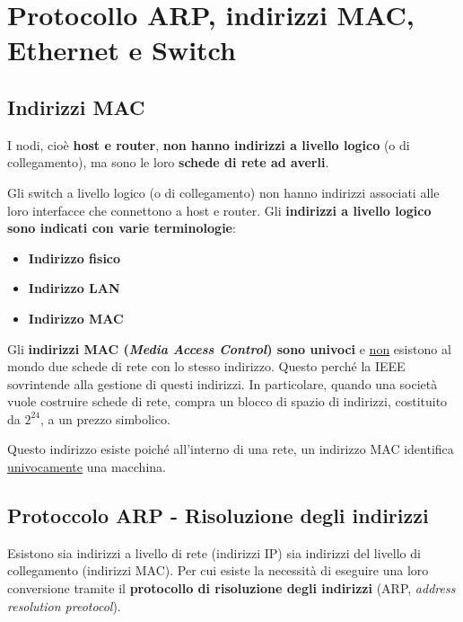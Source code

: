\documentclass[a4paper]{article}
\begin{document}
	\section{Protocollo ARP, indirizzi MAC, Ethernet e Switch}
	
	\subsection{Indirizzi MAC}
	
	I nodi, cioè \textbf{host e router}, \textbf{non hanno indirizzi a livello logico} (o di collegamento), ma sono le loro \textbf{schede di rete ad averli}.\newline
	
	\noindent
	Gli switch a livello logico (o di collegamento) non hanno indirizzi associati alle loro interfacce che connettono a host e router. Gli \textbf{indirizzi a livello logico sono indicati con varie terminologie}:
	\begin{itemize}
		\item \textbf{Indirizzo fisico}
		\item \textbf{Indirizzo LAN}
		\item \textbf{Indirizzo MAC}
	\end{itemize}
	Gli \textbf{\textcolor{Red3}{indirizzi MAC} (\emph{Media Access Control}) sono univoci} e \underline{non} esistono al mondo due schede di rete con lo stesso indirizzo. Questo perché la IEEE sovrintende alla gestione di questi indirizzi. In particolare, quando una società vuole costruire schede di rete, compra un blocco di spazio di indirizzi, costituito da $2^{24}$, a un prezzo simbolico.\newline
	
	\noindent
	Questo indirizzo esiste poiché all'interno di una rete, un indirizzo MAC identifica \underline{univocamente} una macchina.
	
	\subsection{Protoccolo ARP - Risoluzione degli indirizzi}
	
	Esistono sia indirizzi a livello di rete (indirizzi IP) sia indirizzi del livello di collegamento (indirizzi MAC). Per cui esiste la necessità di eseguire una loro conversione tramite il \textcolor{Red3}{\textbf{protocollo di risoluzione degli indirizzi}} (ARP, \emph{address resolution preotocol}).\newline
	
\end{document}
